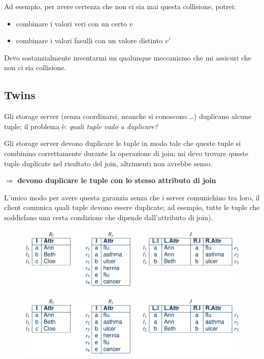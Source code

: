 \documentclass{report}
\begin{document}
\noindent Ad esempio, per avere certezza che non ci sia mai questa collisione, potrei:
\begin{itemize}
    \item combinare i valori veri con un certo $v$
    \item combinare i valori fasulli con un valore distinto $v'$
\end{itemize}

\noindent Devo sostanzialmente inventarmi un qualunque meccanismo che mi assicuri che non ci sia collisione.

\subsection{Twins}

Gli storage server (senza coordinarsi, neanche si conoscono \dots) duplicano alcune tuple;
il problema è: \textit{quali tuple vado a duplicare?}

\noindent Gli storage server devono duplicare le tuple in modo tale che queste tuple si combinino 
correttamente durante la operazione di join; mi devo trovare queste tuple duplicate nel risultato del join, 
altrimenti non avrebbe senso.

$\Rightarrow$ \textbf{devono duplicare le tuple con lo stesso attributo di join}

\noindent L'unico modo per avere 
questa garanzia senza che i server comunichino tra loro, il client comunica quali tuple devono essere 
duplicate; ad esempio, tutte le tuple che soddisfano una certa condizione che dipende dall'attributo di join).

\begin{figure}[H]
    \centering
    \includegraphics[width=1\linewidth]{images/twins1.png}
\end{figure}

\begin{figure}[H]
    \centering
    \includegraphics[width=1\linewidth]{images/twins1.png}
\end{figure}
\end{document}
